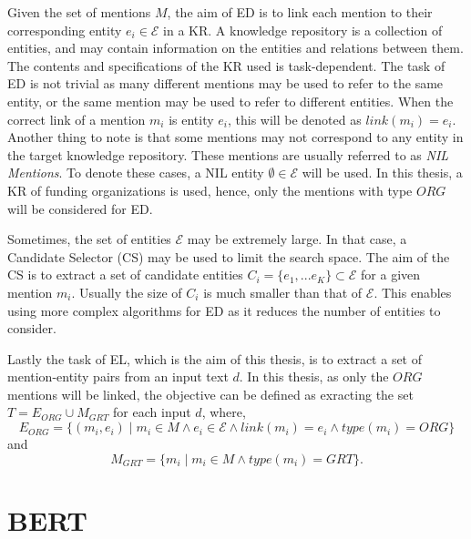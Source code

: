 \documentclass{report}
\theoremstyle{definition}
\theoremstyle{remark}
\begin{document}
Given the set of mentions $M$, the aim of ED is to link each mention to their corresponding entity $e_i \in \mathcal{E} $ in a KR. A knowledge repository is a collection of entities, and may contain information on the entities and relations between them. The contents and specifications of the KR used is task-dependent. The task of ED is not trivial as many different mentions may be used to refer to the same entity, or the same mention may be used to refer to different entities. When the correct link of a mention $m_i$ is entity $e_i$, this will be denoted as $link(m_i) = e_i $.  Another thing to note is that some mentions may not correspond to any entity in the target knowledge repository. These mentions are usually referred to as \textit{NIL Mentions}. To denote these cases, a NIL entity $\emptyset \in \mathcal{E}$ will be used. In this thesis, a KR of funding organizations is used, hence, only the mentions with type $ORG$ will be considered for ED.

Sometimes, the set of entities $\mathcal{E}$ may be extremely large. In that case, a Candidate Selector (CS) may be used to limit the search space. The aim of the CS is to extract a set of candidate entities $C_i = \{e_1,...e_K\} \subset \mathcal{E} $ for a given mention $m_i$. Usually the size of $C_i$ is much smaller than that of $\mathcal{E}$. This enables using more complex algorithms for ED as it reduces the number of entities to consider.

Lastly the task of EL, which is the aim of this thesis, is to extract a set of mention-entity pairs from an input text $d$. In this thesis, as only the $ORG$ mentions will be linked, the objective can be defined as exracting the set $T = E_{ORG} \cup M_{GRT}$ for each input $d$, where,
\begin{equation}
E_{ORG}=\{(m_i,e_i) \mid m_i \in M \land e_i \in \mathcal{E} \land link(m_i)=e_i \land type(m_i) = ORG\}
\end{equation}
and 
\begin{equation}
M_{GRT} = \{m_i \mid m_i \in M \land type(m_i) = GRT\}.
\end{equation}

\section{BERT}
\label{sec:BERT}
\end{document}
